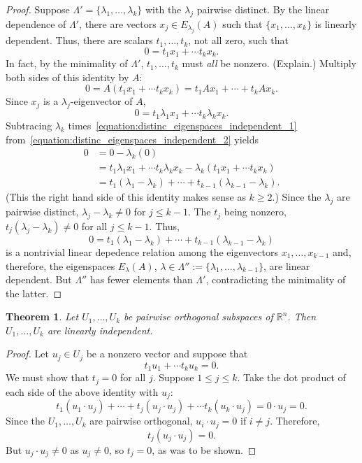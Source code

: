 \documentclass[fullpage]{amsart}
\newcommand{\RR}{\mathbb{R}}
\newtheorem{theorem}{Theorem}[section]
\theoremstyle{definition}
\begin{document}
\begin{proof}
  Suppose $\Lambda'=\{\lambda_1,\ldots,\lambda_k\}$ with the $\lambda_j$ pairwise distinct.
  By the linear dependence of $\Lambda'$, there are vectors $x_j\in E_{\lambda_j}(A)$ such that $\{x_1,\ldots,x_k\}$ is linearly dependent.
  Thus, there are scalars $t_1,\ldots,t_k$, not all zero, such that
  \begin{equation}\label{equation:distinc_eigenspaces_independent_1}
  0=t_1x_1+\cdots t_kx_k.
  \end{equation}
  In fact, by the minimality of $\Lambda'$, $t_1,\ldots,t_k$ must \emph{all} be nonzero. (Explain.)
  Multiply both sides of this identity by $A$:
  $$0 =A(t_1x_1+\cdots t_kx_k)
= t_1Ax_1+\cdots + t_kAx_k.
$$
Since $x_j$ is a $\lambda_j$-eigenvector of $A$,
\begin{equation}\label{equation:distinc_eigenspaces_independent_2}
  0 = t_1\lambda_1x_1 + \cdots t_k\lambda_kx_k.
\end{equation}
Subtracing $\lambda_k$ times~\eqref{equation:distinc_eigenspaces_independent_1} from~\eqref{equation:distinc_eigenspaces_independent_2} yields
\begin{align*}
0 &= 0 - \lambda_k(0) \\
&= t_1\lambda_1x_1+\cdots t_k\lambda_kx_k - \lambda_k(t_1x_1+\cdots t_kx_k)\\
&=t_1(\lambda_1-\lambda_k) + \cdots + t_{k-1}(\lambda_{k-1}-\lambda_k).
\end{align*}
(This the right hand side of this identity makes sense as $k\geq 2$.)
Since the $\lambda_j$ are pairwise distinct, $\lambda_j-\lambda_k\neq 0$ for $j\leq k-1$.
The $t_j$ being nonzero, $t_j(\lambda_j-\lambda_k)\neq 0$ for all $j\leq k-1$.
Thus,
$$
0=t_1(\lambda_1-\lambda_k) + \cdots + t_{k-1}(\lambda_{k-1}-\lambda_k)
$$
is a nontrivial linear depedence relation among the eigenvectors $x_1,\ldots,x_{k-1}$ and, therefore,
the eigenspaces $E_{\lambda}(A)$, $\lambda\in \Lambda'':=\{\lambda_1,\ldots,\lambda_{k-1}\}$, are linear dependent.
But $\Lambda''$ has fewer elements than $\Lambda'$, contradicting the minimality of the latter.
\end{proof}

\begin{theorem}
  Let $U_1,\ldots,U_k$ be pairwise orthogonal subspaces of $\RR^n$. Then $U_1,\ldots,U_k$ are linearly independent.
\end{theorem}

\begin{proof}
  Let $u_j\in U_j$ be a nonzero vector and suppose that
  $$t_1u_1+\cdots t_ku_k=0.$$
  We must show that $t_j=0$ for all $j$.
  Suppose $1\leq j\leq k$.
  Take the dot product of each side of the above identity with $u_j$:
  $$
  t_1(u_1\cdot u_j) + \cdots + t_j(u_j\cdot u_j) + \cdots t_k(u_k\cdot u_j) = 0\cdot u_j = 0.
  $$
  Since the $U_1, \ldots, U_k$ are pairwise orthogonal, $u_i\cdot u_j=0$ if $i\neq j$.
  Therefore,
  $$
  t_j(u_j\cdot u_j) = 0.
  $$
  But $u_j\cdot u_j\neq 0$ as $u_j\neq 0$, so $t_j=0$, as was to be shown.
\end{proof}
\end{document}
